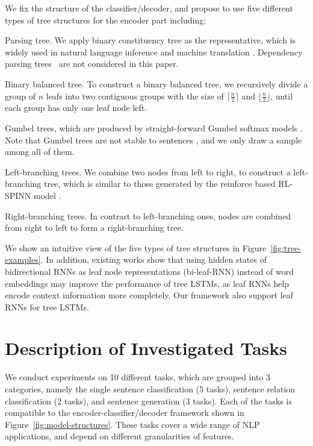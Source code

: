 \documentclass[11pt,a4paper]{article}
\begin{document}
We fix the structure of the classifier/decoder, and propose to use five different types of tree structures for the encoder part including:
\begin{compactitem}
    \item Parsing tree. We apply binary constituency tree as the representative, which is widely used in natural language inference \cite{bowman2016fast} and machine translation \cite{eriguchi2016tree,chen2017improved}. Dependency parsing trees~\cite{zhouhao2015,zhouhao2016} are not considered in this paper.
    \item Binary balanced tree. To construct a binary balanced tree, we recursively divide a group of $n$ leafs into two contiguous groups with the size of $\lceil\frac{n}{2}\rceil$ and $\lfloor\frac{n}{2}\rfloor$, until each group has only one leaf node left. 
    \item Gumbel trees, which are produced by straight-forward Gumbel softmax models \cite{choi2017learning}. Note that Gumbel trees are not stable to sentences \cite{williams2018latent}, and we only draw a sample among all of them. 
    \item Left-branching trees. We combine two nodes from left to right, to construct a left-branching tree, which is similar to those generated by the reinforce based RL-SPINN model \cite{williams2018latent}. 
    \item Right-branching trees. In contrast to left-branching ones, nodes are combined from right to left to form a right-branching tree.
\end{compactitem}
We show an intuitive view of the five types of tree structures in Figure~\ref{fig:tree-examples}.
In addition, existing works \cite{choi2017learning,williams2018latent} show that using hidden states of bidirectional RNNs as leaf node representations (bi-leaf-RNN) instead of word embeddings may improve the performance of tree LSTMs, as leaf RNNs help encode context information more completely. 
Our framework also support leaf RNNs for tree LSTMs.


\section{Description of Investigated Tasks}
\label{sec:tasks}
We conduct experiments on 10 different tasks, which are grouped into 3 categories, namely the single sentence classification (5 tasks), sentence relation classification (2 tasks), and sentence generation (3 tasks).
Each of the tasks is compatible to the encoder-classifier/decoder framework shown in Figure~\ref{fig:model-structures}. 
These tasks cover a wide range of NLP applications, and depend on different granularities of features.
\end{document}
